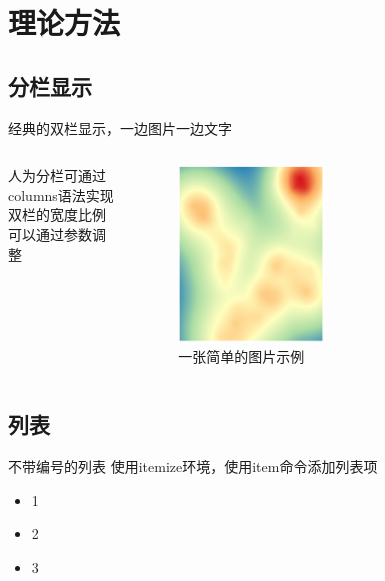 \section{理论方法}

\subsection{分栏显示}
\begin{frame}{经典的双栏显示，一边图片一边文字}
    \begin{columns}
        \begin{column}{0.5\textwidth}
            人为分栏可通过columns语法实现\\
            双栏的宽度比例可以通过参数调整\\

        \end{column}
        \begin{column}{0.5\textwidth}
            \begin{figure}[h]
                \centering
                \includegraphics[width=0.5\textwidth]{images/example.png}
                \caption{一张简单的图片示例}
                \label{fig:3dtiles}
            \end{figure}
        \end{column}
    \end{columns}
\end{frame}

\subsection{列表}
\begin{frame}{不带编号的列表}
    使用itemize环境，使用item命令添加列表项
    \begin{itemize}
        \item 1
        \item 2
        \item 3
    \end{itemize}
\end{frame}

